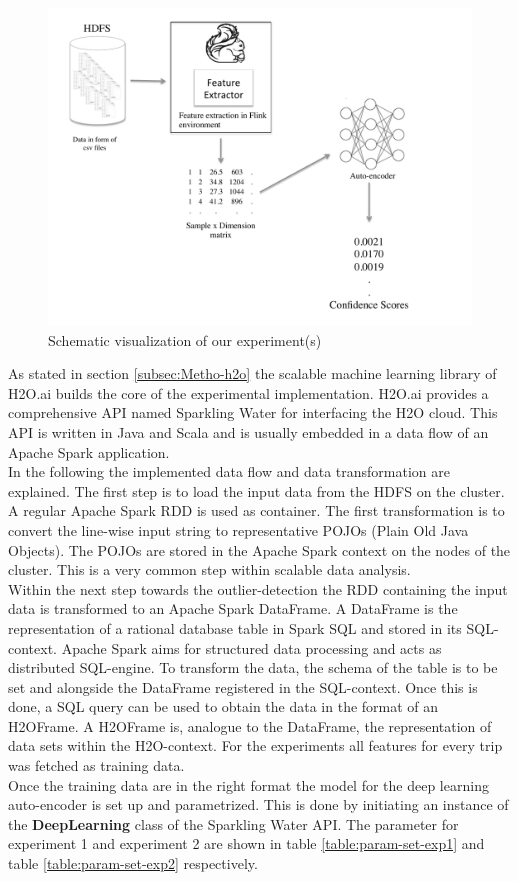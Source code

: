 \documentclass{vldb}
\begin{document}
\begin{figure}
\centering
\includegraphics[trim=1cm 0cm 1cm 0.5cm, clip=true, width=1.2\linewidth]{"pics/approach2"}
\caption{Schematic visualization of our experiment(s)}
\label{fig:approach-2}
\end{figure}

As stated in section \ref{subsec:Metho-h2o} the scalable machine learning library of H2O.ai builds the core of the experimental implementation. H2O.ai provides a comprehensive API named Sparkling Water for interfacing the H2O cloud. This API is written in Java and Scala and is usually embedded in a data flow of an Apache Spark application. \\
In the following the implemented data flow and data transformation are explained. The first step is to load the input data from the HDFS on the cluster. A regular Apache Spark RDD is used as container. The first transformation is to convert the line-wise input string to representative POJOs (Plain Old Java Objects). The POJOs are stored in the Apache Spark context on the nodes of the cluster. This is a very common step within scalable data analysis.\\
Within the next step towards the outlier-detection the RDD containing the input data is transformed to an Apache Spark DataFrame. A DataFrame is the representation of a rational database table in Spark SQL and stored in its SQL-context. Apache Spark aims for structured data processing and acts as distributed SQL-engine. To transform the data, the schema of the table is to be set and alongside the DataFrame registered in the SQL-context. Once this is done, a SQL query can be used to obtain the data in the format of an H2OFrame. A H2OFrame is, analogue to the DataFrame, the representation of data sets within the H2O-context. For the experiments all features for every trip was fetched as training data.\\
Once the training data are in the right format the model for the deep learning auto-encoder is set up and parametrized. This is done by initiating an instance of the \textbf{DeepLearning} class of the Sparkling Water API. The parameter for experiment 1 and experiment 2 are shown in table \ref{table:param-set-exp1} and table \ref{table:param-set-exp2} respectively.
\end{document}
